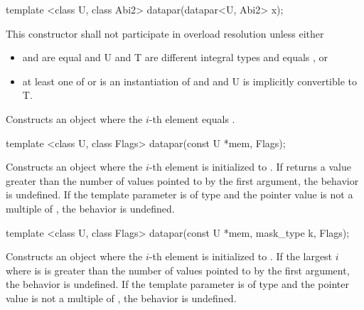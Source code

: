 \begin{itemdecl}
template <class U, class Abi2> datapar(datapar<U, Abi2> x);
\end{itemdecl}
\begin{itemdescr}
  \pnum\remarks This constructor shall not participate in overload resolution unless either
  \begin{itemize}
    \item {} and  are equal and
      \type U and \type T are different integral types and
       equals , or
    \item at least one of  or  is an instantiation of \fixedsizescoped and  and \type U is implicitly convertible to \type T.
  \end{itemize}
  \pnum\effects Constructs an object where the $i$-th element equals  \foralli.
\end{itemdescr}

\begin{itemdecl}
template <class U, class Flags> datapar(const U *mem, Flags);
\end{itemdecl}
\begin{itemdescr}
  \pnum\effects Constructs an object where the $i$-th element is initialized to  \foralli.
  \pnum\remarks If  returns a value greater than the number of values pointed to by the first argument, the behavior is undefined.
  \pnum\remarks If the  template parameter is of type  and the pointer value is not a multiple of , the behavior is undefined.
\end{itemdescr}

\begin{itemdecl}
template <class U, class Flags> datapar(const U *mem, mask_type k, Flags);
\end{itemdecl}
\begin{itemdescr}
  \pnum\effects Constructs an object where the $i$-th element is initialized to  \foralli.
  \pnum\remarks If the largest $i$ where  is \true is greater than the number of values pointed to by the first argument, the behavior is undefined.
  \pnum\remarks If the  template parameter is of type  and the pointer value is not a multiple of , the behavior is undefined.
\end{itemdescr}

